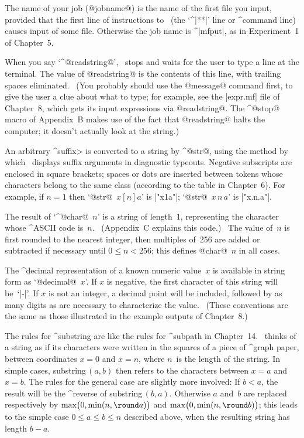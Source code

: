 \ddanger The name of your job (\kern1pt@jobname@) is the name of the first
file you input, provided that the first line of instructions to \MF\
(the `^|**|' line or ^{command line}) causes input of some file.
Otherwise the job name is ^|mfput|, as in Experiment~1 of Chapter~5.

\ddanger When you say `^@readstring@', \MF\ stops and waits for the user
to type a line at the terminal. The value of @readstring@ is the contents
of this line, with trailing spaces eliminated.
\ (You probably should use the @message@ command first, to give the
user a clue about what to type; for example, see the |expr.mf| file
of Chapter~8, which gets its input expressions via @readstring@.
The ^@stop@ macro of Appendix~B makes use of the fact that @readstring@
halts the computer; it doesn't actually look at the string.)

\ddanger An arbitrary ^\<suffix> is converted to a string by ^@str@,
using the method by which \MF\ displays suffix arguments in
diagnostic typeouts. Negative subscripts are enclosed in
square brackets; spaces or dots are inserted between tokens whose
characters belong to the same class (according to the table in
Chapter~6). For example, if $n=1$ then `@str@~$x[n]a$' is |"x1a"|;
`@str@~$x\,n\,a$' is |"x.n.a"|.

\ddanger The result of `^@char@~$n$' is a string of length~1,
representing the character whose ^{ASCII} code is~$n$.
\ (Appendix~C explains this code.) \ The value of~$n$ is first
rounded to the nearest integer, then multiples of~256 are
added or subtracted if necessary until $0\le n<256$; this
defines @char@~$n$ in all cases.

\ddanger The ^{decimal representation} of a known numeric value~$x$
is available in string form as `@decimal@~$x$'. If $x$ is negative,
the first character of this string will be~`|-|'. If $x$ is not
an integer, a decimal point will be included, followed by as
many digits as are necessary to characterize the value. \ (These
conventions are the same as those illustrated in the example
outputs of Chapter~8.)

\ddanger The rules for ^{substring} are like the rules for ^{subpath}
in Chapter~14. \MF\ thinks of a string as if its characters were
written in the squares of a piece of ^{graph paper}, between
coordinates $x=0$ and $x=n$, where $n$~is the length of the string.
In simple cases, substring$\,(a,b)$
then refers to the characters between $x=a$ and~$x=b$. The
rules for the general case are slightly more involved: If $b<a$,
the result will be the ^{reverse} of substring$\,(b,a)$.
Otherwise $a$ and~$b$ are replaced respectively by
$\max\bigl(0,\min(n,\round a)\bigr)$ and
$\max\bigl(0,\min(n,\round b)\bigr)$; this leads to the simple
case $0\le a\le b\le n$ described above, when the resulting
string has length $b-a$.

